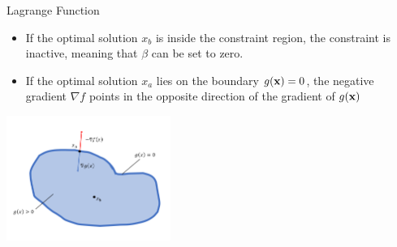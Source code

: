 \begin{vbframe}{Lagrange Function}
\begin{itemize}
	\item If the optimal solution $x_b$ is inside the constraint region, the constraint is inactive, meaning that $\beta$ can be set to zero. 
	\item If the optimal solution $x_a$ lies on the boundary $g(\mathbf{x}) = 0$, the negative gradient $\nabla f$ points in the opposite direction of the gradient of $g(\mathbf{x})$
\end{itemize}

\begin{center}
	\includegraphics[width = 0.4\textwidth]{figure_man/constraint_lagrange.png}
\end{center}
\end{vbframe}














